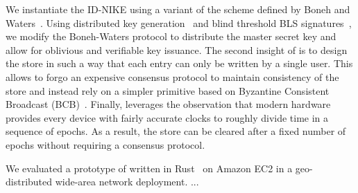 We instantiate the ID-NIKE using a variant of the scheme defined by Boneh and
Waters~\cite{boneh2013constrained}. Using distributed key
generation~\cite{gennaro2007secure,abraham2021reaching,abraham2022bingo} and
blind threshold BLS signatures~\cite{boldyreva2003threshold,bacho2022on}, we
modify the Boneh-Waters protocol to distribute the master secret key and allow
for oblivious and verifiable key issuance. 
The second insight of \sysname is to design the store in such a way that each
entry can only be written by a single user. 
This allows \sysname to forgo an expensive consensus protocol to maintain
consistency of the store and instead rely on a simpler primitive based on
Byzantine Consistent Broadcast (BCB)~\cite{cachin2011introduction}. 
Finally, \sysname leverages the observation that modern hardware provides every
device with fairly accurate clocks to roughly divide time in a sequence of
epochs. As a result, the \sysname store can be cleared after a fixed number of
epochs without requiring a consensus protocol.

We evaluated a prototype of \sysname written in Rust~\cite{matsakis2014rust} on
Amazon EC2 in a geo-distributed wide-area network deployment. ...

